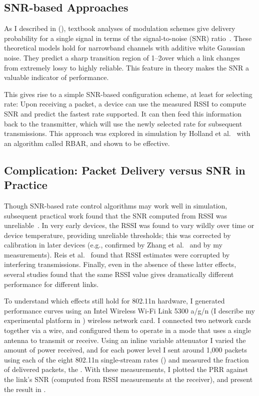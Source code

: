 \subsection{SNR-based Approaches}
As I described in  (), textbook analyses of modulation schemes give delivery probability for a single signal in terms of the signal-to-noise (SNR) ratio~\cite{Goldsmith}.
These theoretical models hold for narrowband channels with additive white Gaussian noise. They predict a sharp transition region of 1--2\dB over which a link changes from extremely lossy to highly reliable. This feature in theory makes the SNR a valuable indicator of performance.

This gives rise to a simple SNR-based configuration scheme, at least for selecting rate: Upon receiving a packet, a device can use the measured RSSI to compute SNR and predict the fastest rate supported. It can then feed this information back to the transmitter, which will use the newly selected rate for subsequent transmissions. This approach was explored in simulation by Holland et al.~\cite{Holland_RBAR} with an algorithm called RBAR, and shown to be effective.

\subsection{Complication: Packet Delivery versus SNR in Practice}
Though SNR-based rate control algorithms may work well in simulation, subsequent practical work found that the SNR computed from RSSI was unreliable~\cite{Aguayo_Roofnet, Reis_interference, Zhao_sensys03}. In very early devices, the RSSI was found to vary wildly over time or device temperature, providing unreliable thresholds; this was corrected by calibration in later devices (e.g., confirmed by Zhang et al.~\cite{Zhang_SNRguided} and by my measurements). Reis et al.~\cite{Reis_interference} found that RSSI estimates were corrupted by interfering transmissions. Finally, even in the absence of these latter effects, several studies found that the same RSSI value gives dramatically different performance for different links.

To understand which effects still hold for 802.11n hardware, I generated performance curves using an Intel Wireless Wi-Fi Link 5300 a/g/n (I describe my experimental platform in ) wireless network card. I connected two network cards together via a wire, and configured them to operate in a mode that uses a single antenna to transmit or receive. Using an inline variable attenuator I varied the amount of power received, and for each power level I sent around 1,000 packets using each of the eight 802.11n single-stream rates () and measured the fraction of delivered packets, the . With these measurements, I plotted the PRR against the link's SNR (computed from RSSI measurements at the receiver), and present the result in . 

